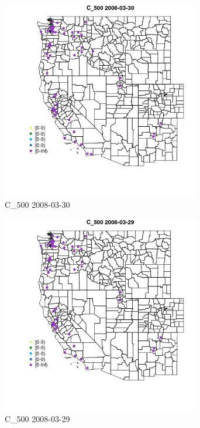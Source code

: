 \begin{figure} 
\centering  
\includegraphics[width=0.77\textwidth]{Code_Outputs/Report_ML_input_PM25_Step4_part_e_de_duplicated_aves_MapObsC_5002008-03-30.jpg} 
\caption{\label{fig:Report_ML_input_PM25_Step4_part_e_de_duplicated_avesMapObsC_5002008-03-30}C_500 2008-03-30} 
\end{figure} 
 

\begin{figure} 
\centering  
\includegraphics[width=0.77\textwidth]{Code_Outputs/Report_ML_input_PM25_Step4_part_e_de_duplicated_aves_MapObsC_5002008-03-29.jpg} 
\caption{\label{fig:Report_ML_input_PM25_Step4_part_e_de_duplicated_avesMapObsC_5002008-03-29}C_500 2008-03-29} 
\end{figure} 
 

